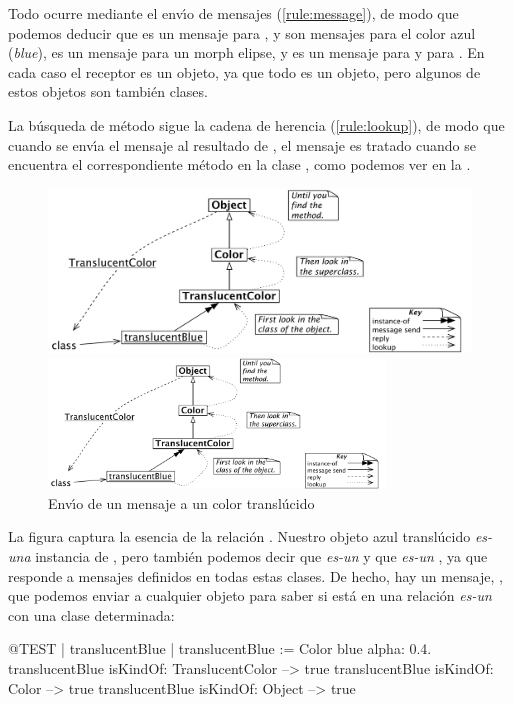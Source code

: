 \documentclass[a4paper,10pt,twoside]{book}
\begin{document}
Todo ocurre mediante el {env\'{\i}o de mensajes\xspace} (\ref{rule:message}), de modo que podemos deducir que  es un mensaje para ,  y  son mensajes para el color azul (\emph{blue}),   es un mensaje para un morph elipse, y  es un mensaje para  y para . En cada caso el receptor es un objeto, ya que todo es un objeto, pero algunos de estos objetos son tambi\'en clases.

La b\'usqueda de m\'etodo sigue la cadena de herencia (\ref{rule:lookup}), de modo que cuando se env\'{\i}a el mensaje  al resultado de , el mensaje es tratado cuando se encuentra el correspondiente m\'etodo en la clase , como podemos ver en la .

\begin{center}
\begin{figure}[!ht]
\ifluluelse
	{\centerline{\includegraphics[width=\textwidth]{TranslucentClassMessage}}}
	{\centerline{\includegraphics[width=0.8\textwidth]{TranslucentClassMessage}}}
\caption{Env\'{\i}o de un mensaje a un color transl\'ucido}
\end{figure}
\end{center}

La figura captura la esencia de la relaci\'on .
Nuestro objeto azul transl\'ucido \emph{es-una} instancia de , pero tambi\'en podemos decir que \emph{es-un}  y que \emph{es-un} , ya que responde a mensajes definidos en todas estas clases. De hecho, hay un mensaje, , que podemos enviar a cualquier objeto para saber si est\'a en una relaci\'on \emph{es-un} con una clase determinada:
\begin{code}{@TEST | translucentBlue |}
translucentBlue := Color blue alpha: 0.4.
translucentBlue isKindOf: TranslucentColor --> true
translucentBlue isKindOf: Color                    --> true
translucentBlue isKindOf: Object                  --> true
\end{code}
\end{document}
